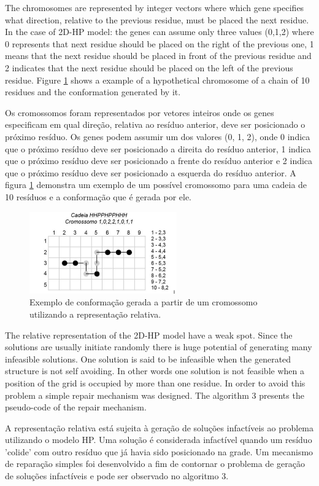 \documentclass[conference]{IEEEtran}
\begin{document}
The chromosomes are represented by integer vectors where which gene specifies what direction, relative to the previous residue, must be placed the next residue. In the case of 2D-HP model: the genes can assume only three values (0,1,2) where 0 represents that next residue should be placed on the right of the previous one, 1 means that the next residue should be placed in front of the previous residue and 2 indicates that the next residue should be placed on the left of the previous residue. Figure \ref{fig_sim} shows a example of a hypothetical chromosome of a chain of 10 residues and the conformation generated by it.

Os cromossomos foram representados por vetores inteiros onde os genes especificam em qual direção, relativa ao resíduo anterior, deve ser posicionado o próximo resíduo. Os genes podem assumir um dos valores (0, 1, 2), onde 0 indica que o próximo resíduo deve ser posicionado a direita do resíduo anterior, 1 indica que o próximo resíduo deve ser posicionado a frente do resíduo anterior e 2 indica que o próximo resíduo deve ser posicionado a esquerda do resíduo anterior. A figura \ref{fig_sim} demonstra um exemplo de um possível cromossomo para uma cadeia de 10 resíduos e a conformação que é gerada por ele.

\begin{figure}[ht]
	\centering
	\includegraphics[width=2.5in]{figure3.png}
	\caption{Exemplo de conformação gerada a partir de um cromossomo utilizando a representação relativa.}
	\label{fig_sim}
\end{figure}

The relative representation of the 2D-HP model have a weak spot. Since the solutions are usually initiate randomly there is huge potential of generating many infeasible solutions. One solution is said to be infeasible when the generated structure is not self avoiding. In other words one solution is not feasible when a position of the grid is occupied by more than one residue. In order to avoid this problem a simple repair mechanism was designed. The algorithm 3 presents the pseudo-code of the repair mechanism.

A representação relativa está sujeita à geração de soluções infactíveis ao problema utilizando o modelo HP. Uma solução é considerada infactível quando um resíduo 'colide' com outro resíduo que já havia sido posicionado na grade. Um mecanismo de reparação simples foi desenvolvido a fim de contornar o problema de geração de soluções infactíveis e pode ser observado no algoritmo 3.
\end{document}
